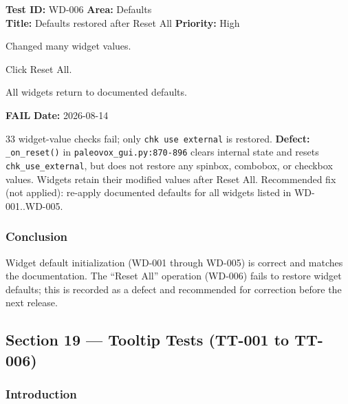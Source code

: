 \documentclass[12pt,a4paper]{article}
\newcommand{\fail}{\textcolor{paleored}{\textbf{FAIL}}}
\newcommand{\testheader}[4]{%
  \smallskip
  \noindent\textbf{Test ID:} #1 \hfill \textbf{Area:} #2 \\
  \textbf{Title:} #3 \hfill \textbf{Priority:} #4
}
\newenvironment{testbody}{%
  \begin{description}[leftmargin=2em,style=nextline]
}{%
  \end{description}
  \smallskip
}
\begin{document}
\testheader{WD-006}{Defaults}{Defaults restored after Reset All}{High}
\begin{testbody}
  \item[\textbf{Preconditions:}] Changed many widget values.
  \item[\textbf{Steps:}] Click Reset All.
  \item[\textbf{Expected Result:}] All widgets return to documented defaults.
  \item[\textbf{Status:}] \fail{} \hspace{1em} \textbf{Date:} 2026-08-14
  \item[\textbf{Notes:}] 33 widget-value checks fail; only
        \texttt{chk use external} is restored. \textbf{Defect:}
        \texttt{\_on\_reset()} in \texttt{paleovox\_gui.py:870-896} clears
        internal state and resets \texttt{chk\_use\_external}, but does not
        restore any spinbox, combobox, or checkbox values. Widgets retain
        their modified values after Reset All. Recommended fix (not applied):
        re-apply documented defaults for all widgets listed in
        WD-001..WD-005.
\end{testbody}

\subsubsection{Conclusion}

Widget default initialization (WD-001 through WD-005) is correct and matches
the documentation. The ``Reset All'' operation (WD-006) fails to restore
widget defaults; this is recorded as a defect and recommended for correction
before the next release.

\newpage

\subsection{Section 19 --- Tooltip Tests (TT-001 to TT-006)}

\subsubsection{Introduction}
\end{document}
